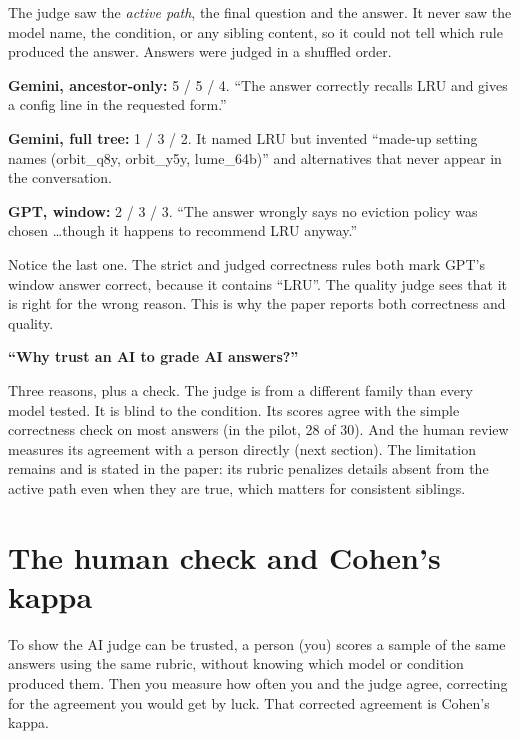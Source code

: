 The judge saw the \emph{active path}, the final question and the answer. It never saw the model name, the condition, or any sibling content, so it could not tell which rule produced the answer. Answers were judged in a shuffled order.

\begin{example}
\textbf{Gemini, ancestor-only:} 5 / 5 / 4. ``The answer correctly recalls LRU and gives a config line in the requested form.''\par
\textbf{Gemini, full tree:} 1 / 3 / 2. It named LRU but invented ``made-up setting names (orbit\_q8y, orbit\_y5y, lume\_64b)'' and alternatives that never appear in the conversation.\par
\textbf{GPT, window:} 2 / 3 / 3. ``The answer wrongly says no eviction policy was chosen \dots though it happens to recommend LRU anyway.''
\end{example}

\begin{plain}
Notice the last one. The strict and judged correctness rules both mark GPT's window answer correct, because it contains ``LRU''. The quality judge sees that it is right for the wrong reason. This is why the paper reports both correctness and quality.
\end{plain}

\begin{ask}
\textbf{``Why trust an AI to grade AI answers?''}\par
Three reasons, plus a check. The judge is from a different family than every model tested. It is blind to the condition. Its scores agree with the simple correctness check on most answers (in the pilot, 28 of 30). And the human review measures its agreement with a person directly (next section). The limitation remains and is stated in the paper: its rubric penalizes details absent from the active path even when they are true, which matters for consistent siblings.
\end{ask}

\section{The human check and Cohen's kappa}

\begin{plain}
To show the AI judge can be trusted, a person (you) scores a sample of the same answers using the same rubric, without knowing which model or condition produced them. Then you measure how often you and the judge agree, correcting for the agreement you would get by luck. That corrected agreement is Cohen's kappa.
\end{plain}


